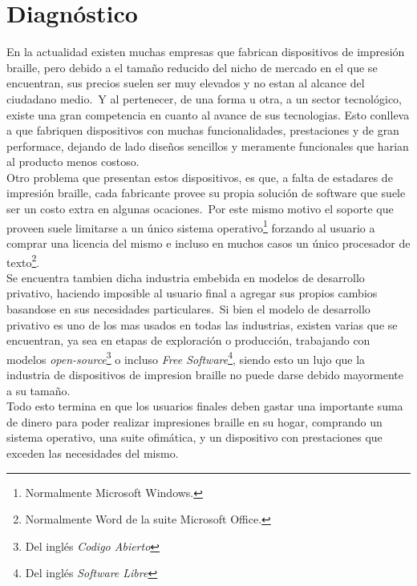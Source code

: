 \chapter{Diagn\'ostico}




En la actualidad existen muchas empresas que fabrican dispositivos de
impresi\'on braille, pero debido a el tama\~no reducido del nicho de mercado
en el que se encuentran, sus precios suelen ser muy elevados y no estan al
alcance del ciudadano medio.\ Y al pertenecer, de una forma u otra, a un sector
tecnol\'ogico, existe una gran competencia en cuanto al avance de sus
tecnologias. Esto conlleva a que fabriquen dispositivos con muchas
funcionalidades, prestaciones y de gran performace, dejando de lado dise\~nos
sencillos y meramente funcionales que harian al producto menos costoso.\\

Otro problema que presentan estos dispositivos, es que, a falta de estadares
de impresi\'on braille, cada fabricante provee su propia soluci\'on de
software que suele ser un costo extra en algunas ocaciones.\ 
Por este mismo motivo el soporte que proveen suele limitarse a un \'unico
sistema operativo\footnote{Normalmente Microsoft Windows.} forzando al usuario
a comprar una licencia del mismo e incluso en muchos casos un \'unico
procesador de texto\footnote{Normalmente Word de la suite Microsoft Office.}.\\

Se encuentra tambien dicha industria embebida en modelos de desarrollo
privativo, haciendo imposible al usuario final a agregar sus propios cambios
basandose en sus necesidades particulares.\ Si bien el modelo de desarrollo
privativo es uno de los mas usados en todas las industrias, existen varias que
se encuentran, ya sea en etapas de exploraci\'on o producci\'on, trabajando con
modelos \emph{open-source}\footnote{Del ingl\'es \emph{Codigo Abierto}} o
incluso \emph{Free Software}\footnote{Del ingl\'es \emph{Software Libre}},
siendo esto un lujo que la industria de dispositivos de impresion braille no
puede darse debido mayormente a su tama\~no.\\

Todo esto termina en que los usuarios finales deben gastar una importante suma
de dinero para poder realizar impresiones braille en su hogar, comprando un
sistema operativo, una suite ofim\'atica, y un dispositivo con prestaciones
que exceden las necesidades del mismo.
